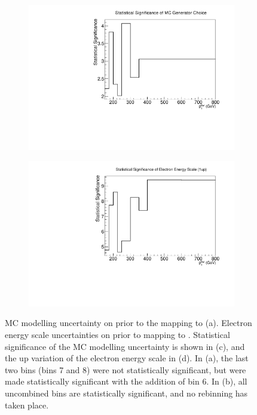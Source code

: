 \begin{figure}[t]
\begin{subfigure}[b]{0.48\textwidth}
    \includegraphics[width=\textwidth]{plots/insitu/mcchoice_sig.pdf}
    \caption{}
    \label{fig:insitupt:c}
\end{subfigure}
\begin{subfigure}[b]{0.48\textwidth}
    \centering
    \includegraphics[width=\textwidth]{plots/insitu/eescale_sig.pdf}
    \caption{}
    \label{fig:insitupt:d}
\end{subfigure}
\caption{MC modelling uncertainty on \rdb prior to the mapping to \ptJ (a). Electron energy scale uncertainties on \rdb prior to mapping to \ptJ. Statistical significance of the MC modelling uncertainty is shown in (c), and the up variation of the electron energy scale in (d). In (a), the last two bins (bins 7 and 8) were not statistically significant, but were made statistically significant with the addition of bin 6. In (b), all uncombined bins are statistically significant, and no rebinning has taken place.\label{fig:insitu:mctypescale}}%
\end{figure}

